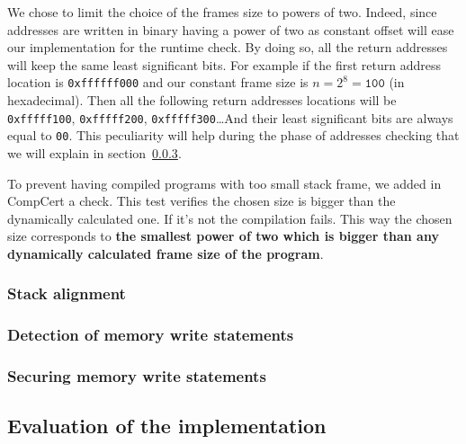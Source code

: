 \documentclass[11pt]{sdm}
\begin{document}
We chose to limit the choice of the frames size to powers of two. Indeed, since addresses are written in binary having a power of two as constant offset will ease our implementation for the runtime check. By doing so, all the return addresses will keep the same least significant bits. For example if the first return address location is \texttt{0xffffff000} and our constant frame size is $n = 2^8 = \texttt{100}$ (in hexadecimal). Then all the following return addresses locations will be \texttt{0xfffff100}, \texttt{0xfffff200}, \texttt{0xfffff300}\dots And their least significant bits are always equal to \texttt{00}. This peculiarity will help during the phase of addresses checking that we will explain in section~\ref{ssub:implem_check_address}.

To prevent having compiled programs with too small stack frame, we added in CompCert a check. This test verifies the chosen size is bigger than the dynamically calculated one. If it's not the compilation fails. This way the chosen size corresponds to \textbf{the smallest power of two which is bigger than any dynamically calculated frame size of the program}.

\subsubsection{Stack alignment}
\label{ssub:Stack alignment}

\subsubsection{Detection of memory write statements}
\label{ssub:Detection of memory write statements}

\subsubsection{Securing memory write statements}
\label{ssub:implem_check_address}

\subsection{Evaluation of the implementation}
\label{sub:Evaluation of the implementation}
\end{document}
